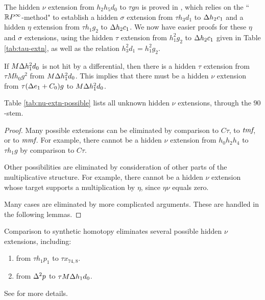 \begin{remark}
\label{rem:nu-h2h5d0}
The hidden $\nu$ extension from $h_2 h_5 d_0$ to $\tau g n$
is proved in \cite{WangXu18}, which relies on the
``$\mathbb{R} P^\infty$-method" to establish a hidden
$\sigma$ extension from $\tau h_3 d_1$ to $\Delta h_2 c_1$
and a hidden $\eta$ extension from $\tau h_1 g_2$ to $\Delta h_2 c_1$.
We now have easier proofs for these $\eta$ and $\sigma$ extensions,
using the hidden $\tau$ extension from $h_1^2 g_2$ to $\Delta h_2 c_1$
given in Table \ref{tab:tau-extn}, as well as the relation
$h_3^2 d_1 = h_1^2 g_2$.
\end{remark}

\begin{remark}
\label{rem:nu-t(De1+C0)g}
If $M \Delta h_1^2 d_0$ is not hit by a differential, then there is a 
hidden $\tau$ extension from $\tau M h_0 g^2$ from $M \Delta h_1^2 d_0$.
This implies that there must be a hidden
$\nu$ extension from $\tau (\Delta e_1 + C_0) g$ to $M \Delta h_1^2 d_0$.
\end{remark}

\begin{thm}
\label{thm:nu-extn-possible}
Table \ref{tab:nu-extn-possible}
lists all unknown hidden $\nu$ extensions, through
the $90$-stem. 
\end{thm}

\begin{proof}
Many possible extensions can be eliminated by
comparison to $C\tau$, to $\textit{tmf}$, or to $\textit{mmf}$.
For example,
there cannot be a hidden $\nu$ extension from $h_0 h_2 h_4$
to $\tau h_1 g$ by comparison to $C\tau$.

Other possibilities are eliminated by consideration of other
parts of the multiplicative structure.  For example,
there cannot be a hidden $\nu$ extension whose target supports
a multiplication by $\eta$, since $\eta \nu$ equals zero.

Many cases are eliminated by more complicated arguments.
These are handled in the following lemmas.
\end{proof}

\begin{remark}
\label{rem:h2-th1p1}
Comparison to synthetic homotopy eliminates several
possible hidden $\nu$ extensions, including:
\begin{enumerate}
\item
from $\tau h_1 p_1$ to $\tau x_{74,8}$.
\item
from $\Delta^2 p$ to $\tau M \Delta h_1 d_0$.
\end{enumerate}
See \cite{BIX} for more details.
\end{remark}

